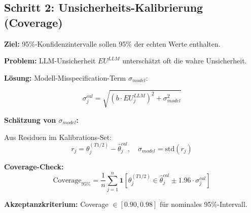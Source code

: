 \subsection{Schritt 2: Unsicherheits-Kalibrierung (Coverage)}

\begin{tcolorbox}[colback=gray!5!white, colframe=gray!75!black,
    title=\textbf{Axiom UNMAPPED_CAL-3: Coverage-Kalibrierung}]

\textbf{Ziel:} 95\%-Konfidenzintervalle sollen 95\% der echten Werte enthalten.

\textbf{Problem:} LLM-Unsicherheit $EU^{LLM}$ unterschätzt oft die wahre Unsicherheit.

\textbf{Lösung:} Modell-Misspecification-Term $\sigma_{model}$:

\begin{equation}
\boxed{\sigma_j^{cal} = \sqrt{(b \cdot EU_j^{LLM})^2 + \sigma_{model}^2}}
\end{equation}

\textbf{Schätzung von $\sigma_{model}$:}

Aus Residuen im Kalibrations-Set:
\begin{equation}
r_j = \theta_j^{(T1/2)} - \hat{\theta}_j^{cal}, \quad \sigma_{model} = \text{std}(r_j)
\end{equation}

\textbf{Coverage-Check:}
\begin{equation}
\text{Coverage}_{95\%} = \frac{1}{n} \sum_{j=1}^{n} \mathbf{1}\left[\theta_j^{(T1/2)} \in \hat{\theta}_j^{cal} \pm 1.96 \cdot \sigma_j^{cal}\right]
\end{equation}

\textbf{Akzeptanzkriterium:} Coverage $\in [0.90, 0.98]$ für nominales 95\%-Intervall.

\end{tcolorbox}

